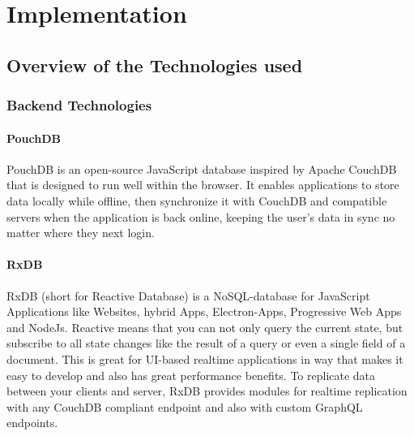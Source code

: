 \chapter{Implementation}



\section{Overview of the Technologies used}

\subsection{Backend Technologies}

    \subsubsection{PouchDB}
    PouchDB is an open-source JavaScript database inspired by Apache CouchDB 
    that is designed to run well within the browser.
    It enables applications to store data locally while offline, 
    then synchronize it with CouchDB and compatible servers when the application is back online, keeping the user's data in sync 
    no matter where they next login.

    \subsubsection{RxDB}
    RxDB (short for Reactive Database) is a NoSQL-database for JavaScript Applications like Websites, 
    hybrid Apps, Electron-Apps, Progressive Web Apps and NodeJs. Reactive means that you can not only 
    query the current state, but subscribe to all state changes like the result of a query or even a 
    single field of a document. This is great for UI-based realtime applications in way that makes it 
    easy to develop and also has great performance benefits. To replicate data between your clients and server,
    RxDB provides modules for realtime replication with any CouchDB compliant endpoint and also with custom GraphQL endpoints. 

